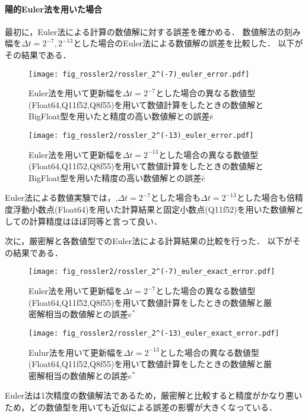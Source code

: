 \paragraph*{陽的Euler法を用いた場合}
最初に，Euler法による計算の数値解に対する誤差を確かめる．
数値解法の刻み幅を$\Delta t = 2^{-7},2^{-13}$とした場合のEuler法による数値解の誤差を比較した．
以下がその結果である．
\begin{figure}[H]
    \centering
    \begin{minipage}[b]{0.49\columnwidth}
        \centering
        \texttt{[image: fig\_rossler2/rossler\_2^(-7)\_euler\_error.pdf]}
        \caption{Euler法を用いて更新幅を$\Delta t = 2^{-7}$とした場合の異なる数値型(Float64,Q11f52,Q8f55)を用いて数値計算をしたときの数値解とBigFloat型を用いたと精度の高い数値解との誤差$\bar{e}$}
        \label{fig:rossler_2^(-7)_euler_error}
    \end{minipage}
    \begin{minipage}[b]{0.49\columnwidth}
        \centering
        \texttt{[image: fig\_rossler2/rossler\_2^(-13)\_euler\_error.pdf]}
        \caption{Euler法を用いて更新幅を$\Delta t =  2^{-13}$とした場合の異なる数値型(Float64,Q11f52,Q8f55)を用いて数値計算をしたときの数値解とBigFloat型を用いた精度の高い数値解との誤差$\bar{e}$}
        \label{fig:rossler_2^(-13)_euler_error}
    \end{minipage}
\end{figure} 
Euler法による数値実験では，,$\Delta t = 2^{-7}$とした場合も$\Delta t =  2^{-13}$とした場合も倍精度浮動小数点(Float64)を用いた計算結果と固定小数点(Q11f52)を用いた数値解としての計算精度はほぼ同等と言って良い．


次に，厳密解と各数値型でのEuler法による計算結果の比較を行った．
以下がその結果である．\\
\begin{figure}[H]
    \centering
    \begin{minipage}[b]{0.49\columnwidth}
        \centering
        \texttt{[image: fig\_rossler2/rossler\_2^(-7)\_euler\_exact\_error.pdf]}
        \caption{Euler法を用いて更新幅を$\Delta t = 2^{-7}$とした場合の異なる数値型(Float64,Q11f52,Q8f55)を用いて数値計算をしたときの数値解と厳密解相当の数値解との誤差$e^{\ast}$}
        \label{fig:rossler_2^(-7)_eluer_exact_error}
    \end{minipage}
    \begin{minipage}[b]{0.49\columnwidth}
        \centering
        \texttt{[image: fig\_rossler2/rossler\_2^(-13)\_euler\_exact\_error.pdf]}
        \caption{Eulur法を用いて更新幅を$\Delta t =  2^{-13}$とした場合の異なる数値型(Float64,Q11f52,Q8f55)を用いて数値計算をしたときの数値解と厳密解相当の数値解との誤差$e^{\ast}$}
        \label{fig:rossler_2^(-13)_euler_exact_error}
    \end{minipage}
\end{figure}
Euler法は1次精度の数値解法であるため，厳密解と比較すると精度がかなり悪いため，どの数値型を用いても近似による誤差の影響が大きくなっている．

